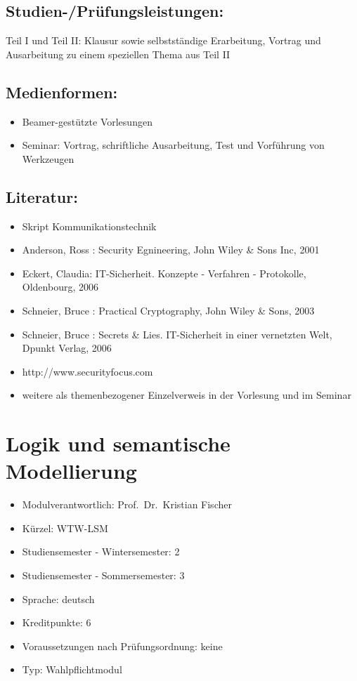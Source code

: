 \section*{Studien-/Prüfungsleistungen:}\label{studien-pruxfcfungsleistungen-19}

Teil I und Teil II: Klausur sowie selbstständige Erarbeitung, Vortrag
und Ausarbeitung zu einem speziellen Thema aus Teil II

\section*{Medienformen:}\label{medienformen-19}

\begin{itemize}
\item
  Beamer-gestützte Vorlesungen
\item
  Seminar: Vortrag, schriftliche Ausarbeitung, Test und Vorführung von
  Werkzeugen
\end{itemize}

\section*{Literatur:}\label{literatur-16}

\begin{itemize}
\item
  Skript Kommunikationstechnik
\item
  Anderson, Ross : Security Egnineering, John Wiley \& Sons Inc, 2001
\item
  Eckert, Claudia: IT-Sicherheit. Konzepte - Verfahren - Protokolle,
  Oldenbourg, 2006
\item
  Schneier, Bruce : Practical Cryptography, John Wiley \& Sons, 2003
\item
  Schneier, Bruce : Secrets \& Lies. IT-Sicherheit in einer vernetzten
  Welt, Dpunkt Verlag, 2006
\item
  http://www.securityfocus.com
\item
  weitere als themenbezogener Einzelverweis in der Vorlesung und im
  Seminar
\end{itemize}

\chapter{Logik und semantische
Modellierung}\label{logik-und-semantische-modellierung}

\begin{itemize}
\tightlist
\item
  Modulverantwortlich: Prof.~Dr.~Kristian Fischer
\item
  Kürzel: WTW-LSM
\item
  Studiensemester - Wintersemester: 2
\item
  Studiensemester - Sommersemester: 3
\item
  Sprache: deutsch
\item
  Kreditpunkte: 6
\item
  Voraussetzungen nach Prüfungsordnung: keine
\item
  Typ: Wahlpflichtmodul
\end{itemize}

